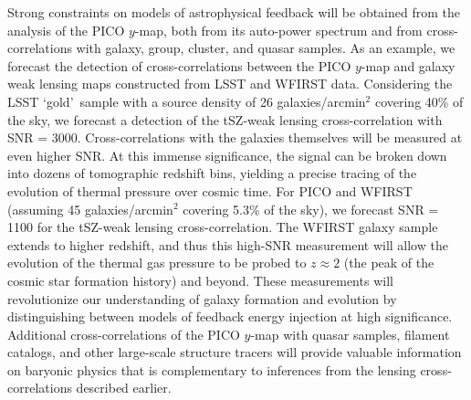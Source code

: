 \documentclass[PICOReport.tex]{subfiles}
\begin{document}
Strong constraints on models of astrophysical feedback will be obtained from the analysis of the PICO $y$-map, both from its auto-power spectrum and from cross-correlations with galaxy, group, cluster, and quasar samples. 
As an example, we forecast the detection of cross-correlations between the PICO $y$-map and galaxy weak lensing maps constructed from LSST and WFIRST data.  Considering the LSST \lq gold\rq~sample with a source density of 26 galaxies/arcmin${}^2$ covering 40\% of the sky, we forecast a detection of the tSZ-weak lensing cross-correlation with \ac{SNR} = 3000.  Cross-correlations with the galaxies themselves will be measured at even higher \ac{SNR}.  At this immense significance, the signal can be broken down into dozens of tomographic redshift bins, yielding a precise tracing of the evolution of thermal pressure over cosmic time.  For PICO and WFIRST (assuming 45 galaxies/arcmin${}^2$ covering 5.3\% of the sky), we forecast \ac{SNR} = 1100 for the tSZ-weak lensing cross-correlation.  The WFIRST galaxy sample extends to higher redshift, and thus this high-\ac{SNR} measurement will allow the evolution of the thermal gas pressure to be probed to $z \approx 2$ (the peak of the cosmic star formation history) and beyond.  These measurements will revolutionize our understanding of galaxy formation and evolution by distinguishing between models of feedback energy injection at high significance.  Additional cross-correlations of the PICO $y$-map with quasar samples, filament catalogs, and other large-scale structure tracers will provide valuable information on baryonic physics that is complementary to inferences from the lensing cross-correlations described earlier.  
\end{document}
